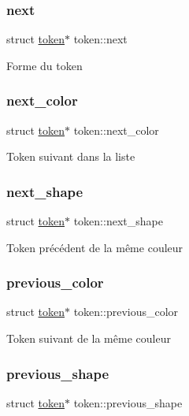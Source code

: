 \subsubsection{\texorpdfstring{next}{next}}
{\footnotesize\ttfamily struct \hyperlink{structtoken}{token}$\ast$ token\+::next}

Forme du token \mbox{\label{structtoken_aeeac6077761a45ebc4d41150cb8e0b22}} 
\subsubsection{\texorpdfstring{next\+\_\+color}{next\_color}}
{\footnotesize\ttfamily struct \hyperlink{structtoken}{token}$\ast$ token\+::next\+\_\+color}

Token suivant dans la liste \mbox{\label{structtoken_a18af74e038da24435e31faf1b208ddca}} 
\subsubsection{\texorpdfstring{next\+\_\+shape}{next\_shape}}
{\footnotesize\ttfamily struct \hyperlink{structtoken}{token}$\ast$ token\+::next\+\_\+shape}

Token précédent de la même couleur \mbox{\label{structtoken_acd6e4c0c716198eb9ea04af1e36cf458}} 
\subsubsection{\texorpdfstring{previous\+\_\+color}{previous\_color}}
{\footnotesize\ttfamily struct \hyperlink{structtoken}{token}$\ast$ token\+::previous\+\_\+color}

Token suivant de la même couleur \mbox{\label{structtoken_ac4c029efc61de4a5e927d55fd585eb70}} 
\subsubsection{\texorpdfstring{previous\+\_\+shape}{previous\_shape}}
{\footnotesize\ttfamily struct \hyperlink{structtoken}{token}$\ast$ token\+::previous\+\_\+shape}


